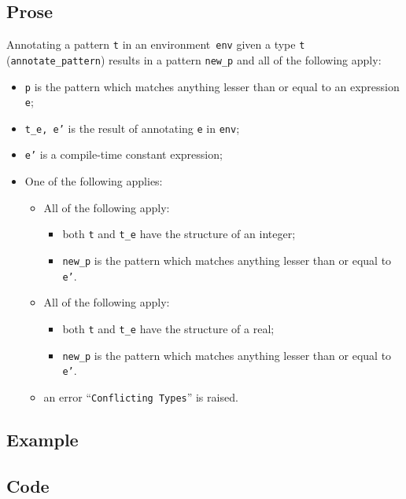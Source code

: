 \documentclass{book}
\begin{document}
  \subsection{Prose}
   Annotating a pattern \texttt{t} in an environment~\texttt{env} given a type \texttt{t} (\texttt{annotate\_pattern}) results in a pattern \texttt{new\_p} and all of the following apply:
   \begin{itemize}
   \item \texttt{p} is the pattern which matches anything lesser than or equal to an expression \texttt{e};
   \item \texttt{t\_e, e'} is the result of annotating \texttt{e} in \texttt{env}; 
   \item \texttt{e'} is a compile-time constant expression;
   \item One of the following applies:
     \begin{itemize}
     \item All of the following apply:
           \begin{itemize}
           \item both \texttt{t} and \texttt{t\_e} have the structure of an integer;
           \item \texttt{new\_p} is the pattern which matches anything lesser than or equal to \texttt{e'}.
           \end{itemize}
     \item All of the following apply:
           \begin{itemize}
           \item both \texttt{t} and \texttt{t\_e} have the structure of a real;
           \item \texttt{new\_p} is the pattern which matches anything lesser than or equal to \texttt{e'}.
           \end{itemize}
     \item an error ``\texttt{Conflicting Types}'' is raised.
     \end{itemize}
   \end{itemize}

  \subsection{Example}

  \subsection{Code}
\end{document}

